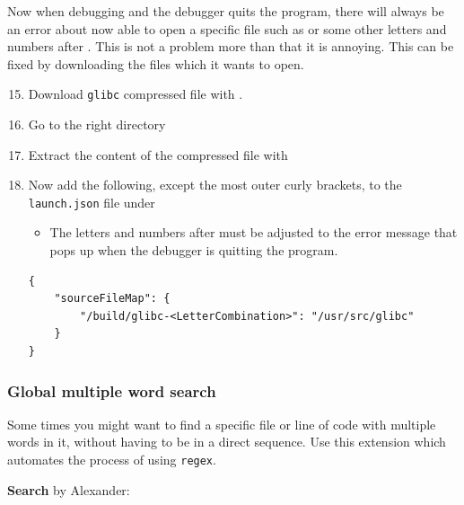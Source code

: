 Now when debugging and the debugger quits the program, there will always be an error about now able to open a specific file such as  or some other letters and numbers after . This is not a problem more than that it is annoying. This can be fixed by downloading the files which it wants to open.

\begin{enumerate}
    \setcounter{enumi}{14}
    
    \item Download \texttt{glibc} compressed file with .
    
    \item Go to the right directory 
    
    \item Extract the content of the compressed file with 
    
    \item Now add the following, except the most outer curly brackets, to the \texttt{launch.json} file under\\
    \begin{itemize}
        \item The letters and numbers  after  must be adjusted to the error message that pops up when the debugger is quitting the program.
    \end{itemize}
    
    \begin{verbatim}
{
    "sourceFileMap": {
        "/build/glibc-<LetterCombination>": "/usr/src/glibc"
    }
}
    \end{verbatim}
\end{enumerate}

\subsubsection{Global multiple word search}

Some times you might want to find a specific file or line of code with multiple words in it, without
having to be in a direct sequence. Use this extension which automates the process of using \texttt{regex}.

\textbf{Search} by Alexander:

